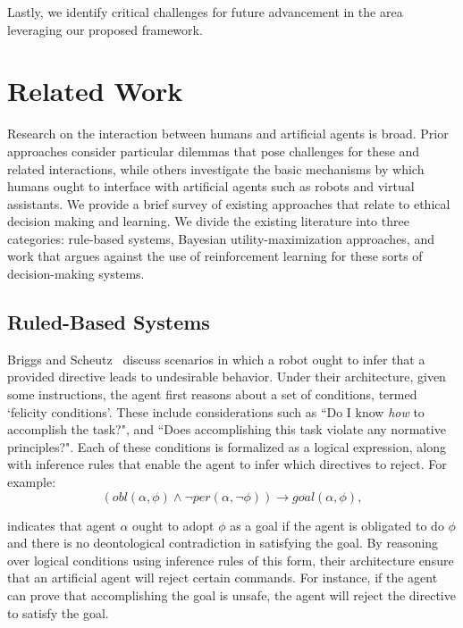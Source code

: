 \documentclass[11pt]{article}
\begin{document}
Lastly, we identify critical challenges for future advancement in the area leveraging our proposed framework.


\section{Related Work}

Research on the interaction between humans and artificial agents is broad. Prior approaches consider particular dilemmas that pose challenges for these and related interactions, while others investigate the basic mechanisms by which humans ought to interface with artificial agents such as robots and virtual assistants. We provide a brief survey of existing approaches that relate to ethical decision making and learning. We divide the existing literature into three categories: rule-based systems, Bayesian utility-maximization approaches, and work that argues against the use of reinforcement learning for these sorts of decision-making systems.


\subsection{Ruled-Based Systems}

Briggs and Scheutz~ discuss scenarios in which a robot ought to infer that a provided directive leads to undesirable behavior. Under their architecture, given some instructions, the agent first reasons about a set of conditions, termed `felicity conditions'. These include considerations such as ``Do I know {\it how} to accomplish the task?", and ``Does accomplishing this task violate any normative principles?". Each of these conditions is formalized as a logical expression, along with inference rules that enable the agent to infer which directives to reject. For example:
\begin{equation}
\left(obl(\alpha,\phi) \wedge \neg per(\alpha, \neg\phi)\right) \rightarrow goal(\alpha, \phi),
\end{equation}

\noindent indicates that agent $\alpha$ ought to adopt $\phi$ as a goal if the agent is obligated to do $\phi$ and there is no deontological contradiction in satisfying the goal. By reasoning over logical conditions using inference rules of this form, their architecture ensure that an artificial agent will reject certain commands. For instance, if the agent can prove that accomplishing the goal is unsafe, the agent will reject the directive to satisfy the goal.
\end{document}

